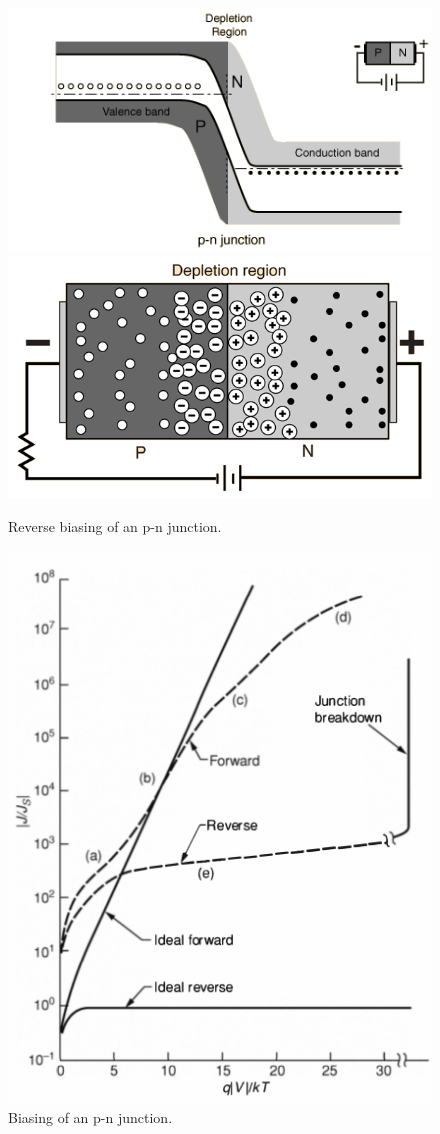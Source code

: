 \documentclass[report]{subfiles}
\begin{document}
\begin{figure}[H]
\centering
\includegraphics[scale=0.8]{pics/reverse_bias.png}
\includegraphics[scale=0.6]{pics/reverse_bias2.png}
\caption{Reverse biasing of an p-n junction.}
\end{figure}

\begin{figure}[H]
\centering
\includegraphics[scale=0.5]{pics/biasing.png}
\caption{Biasing of an p-n junction.}
\end{figure}
\end{document}
